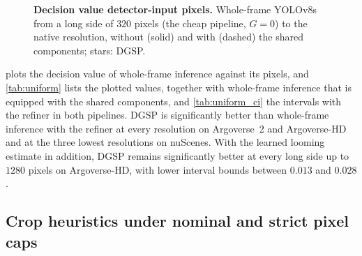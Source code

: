\documentclass[10pt,letterpaper]{article}
\newcommand{\method}{DGSP\xspace}
\newcommand{\G}{G}
\theoremstyle{remark}
\theoremstyle{plain}
\theoremstyle{definition}
\begin{document}
\begin{figure}[!htbp]
\begin{minipage}{0.52\linewidth}
\end{minipage}
\caption{\textbf{Decision value \vs detector-input pixels.} Whole-frame YOLOv8s from a long side of $320$ pixels (the cheap pipeline, $\G=0$) to the native resolution, without (solid) and with (dashed) the shared components; stars: \method.}
\label{fig:gpx}
\end{figure}

 plots the decision value of whole-frame inference against its pixels, and \cref{tab:uniform} lists the plotted values, together with whole-frame inference that is equipped with the shared components, and \cref{tab:uniform_ci} the intervals with the refiner in both pipelines.
\method is significantly better than whole-frame inference with the refiner at every resolution on Argoverse~2 and Argoverse-HD and at the three lowest resolutions on nuScenes.
With the learned looming estimate in addition, \method remains significantly better at every long side up to $1280$ pixels on Argoverse-HD, with lower interval bounds between $0.013$ and $0.028$.

\subsection{Crop heuristics under nominal and strict pixel caps}
\label{sec:supp_heuristics}
\end{document}

